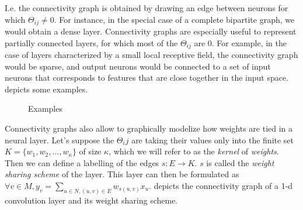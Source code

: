 \begin{definition}
I.e. the connectivity graph is obtained by drawing an edge between neurons for which $\Theta_{ij} \neq 0$.
For instance, in the special case of a complete bipartite graph, we would obtain a dense layer. 
Connectivity graphs are especially useful to represent partially connected layers, for which most of the $\Theta_{ij}$ are $0$. 
For example, in the case of layers characterized by a small local receptive field, the connectivity graph would be sparse, and output neurons would be connected to a set of input neurons that corresponds to features that are close together in the input space.  depicts some examples.

\begin{figure}[h]
  \begin{center}
  \end{center}
  \caption{Examples}
  \label{con_ex}
\end{figure}



Connectivity graphs also allow to graphically modelize how weights are tied in a neural layer. Let's suppose the $\Theta_ij$ are taking their values only into the finite set $K = \{w_1, w_2, \ldots, w_\kappa\}$ of size $\kappa$, which we will refer to as the \emph{kernel} of \emph{weights}. Then we can define a labelling of the edges $s: E \rightarrow K$. $s$ is called the \emph{weight sharing scheme} of the layer. This layer can then be formulated as $\displaystyle \forall v \in M, y_v = \sum_{u \in N, (u,v) \in E} w_{s(u,v)} x_u$.  depicts the connectivity graph of a 1-d convolution layer and its weight sharing scheme.


\end{definition}
